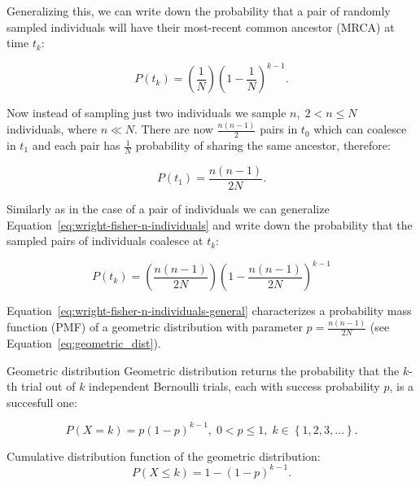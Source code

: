 Generalizing this, we can write down the probability that a pair of randomly sampled individuals will have their most-recent common ancestor (MRCA) at time $t_{k}$:

\begin{equation}
P\left(t_{k}\right)=\left(\frac{1}{N}\right)\left(1-\frac{1}{N}\right)^{k-1}.
\label{eq:wright-fisher-two-individuals}
\end{equation}

\noindent
Now instead of sampling just two individuals we sample $n,\;2<n\leq N$ individuals, where $n\ll N$.
There are now $\frac{n\left(n-1\right)}{2}$ pairs in $t_{0}$ which can coalesce in $t_{1}$ and each pair has  $\frac{1}{N}$ probability of sharing the same ancestor, therefore:

\begin{equation}
P\left(t_{1}\right)=\frac{n\left(n-1\right)}{2N}.
\label{eq:wright-fisher-n-individuals}
\end{equation}

\noindent
Similarly as in the case of a pair of individuals we can generalize Equation~\ref{eq:wright-fisher-n-individuals} and write down the probability that the sampled pairs of individuals coalesce at $t_{k}$:

\begin{equation}
P\left(t_{k}\right)=\left(\frac{n\left(n-1\right)}{2N}\right)\left(1-\frac{n\left(n-1\right)}{2N}\right)^{k-1}
\label{eq:wright-fisher-n-individuals-general}
\end{equation}

\noindent
Equation~\ref{eq:wright-fisher-n-individuals-general} characterizes a probability mass function (PMF) of a geometric distribution with parameter $p=\frac{n\left(n-1\right)}{2N}$ (see Equation~\ref{eq:geometric_dist}).

\begin{remark}{Geometric distribution}
Geometric distribution returns the probability that the $k$-th trial out of $k$ independent Bernoulli trials, each with success probability $p$, is a succesfull one:

\begin{equation}
P\left(X=k\right)=p\left(1-p\right)^{k-1},\;0<p\leq1,\; k\in\left\{ 1,2,3,\ldots\right\}.
\label{eq:geometric_dist}
\end{equation}

\noindent
Cumulative distribution function of the geometric distribution:
\begin{equation}
P(X\leq k)=1-\left(1-p\right)^{k-1}.
\label{eq:geometric_cdf}
\end{equation}
\end{remark}

